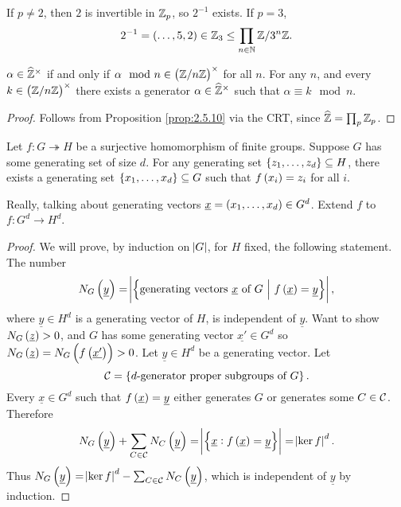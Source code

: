 \pagebreak

\begin{example*}
If $ p \ne 2 $, then $ 2 $ is invertible in $ \mathbb{Z}_p $, so $ 2^{-1} $ exists. If $ p = 3 $,
$$ 2^{-1} = \br{\dots, 5, 2} \in \ZZ_3 \le \prod_{n \in \NN} \ZZ / 3^n\ZZ. $$
\end{example*}

\begin{proposition}
$ \alpha \in \widehat{\mathbb{Z}}^\times $ if and only if $ \alpha \mod n \in \br{\ZZ / n\ZZ}^\times $ for all $ n $. For any $ n $, and every $ k \in \br{\ZZ / n\ZZ}^\times $ there exists a generator $ \alpha \in \widehat{\mathbb{Z}}^\times $ such that $ \alpha \equiv k \mod n $.
\end{proposition}

\begin{proof}
Follows from Proposition \ref{prop:2.5.10} via the CRT, since $ \widehat{\mathbb{Z}} = \prod_p \mathbb{Z}_p $.
\end{proof}

\begin{theorem}
Let $ f : G \twoheadrightarrow H $ be a surjective homomorphism of finite groups. Suppose $ G $ has some generating set of size $ d $. For any generating set $ \cbr{z_1, \dots, z_d} \subseteq H $, there exists a generating set $ \cbr{x_1, \dots, x_d} \subseteq G $ such that $ f\br{x_i} = z_i $ for all $ i $.
\end{theorem}

Really, talking about generating vectors $ \underline{x} = \br{x_1, \dots, x_d} \in G^d $. Extend $ f $ to $ f : G^d \to H^d $.

\begin{proof}
We will prove, by induction on $ \abs{G} $, for $ H $ fixed, the following statement. The number
$$ N_G\br{\underline{y}} = \abs{\cbr{\text{generating vectors} \ \underline{x} \ \text{of} \ G \st f\br{\underline{x}} = \underline{y}}}, $$
where $ \underline{y} \in H^d $ is a generating vector of $ H $, is independent of $ \underline{y} $. Want to show $ N_G\br{\underline{z}} > 0 $, and $ G $ has some generating vector $ \underline{x'} \in G^d $ so $ N_G\br{\underline{z}} = N_G\br{f\br{\underline{x'}}} > 0 $. Let $ \underline{y} \in H^d $ be a generating vector. Let
$$ \CCC = \cbr{\text{$ d $-generator proper subgroups of} \ G}. $$
Every $ \underline{x} \in G^d $ such that $ f\br{\underline{x}} = \underline{y} $ either generates $ G $ or generates some $ C \in \mathcal{C} $. Therefore
$$ N_G\br{\underline{y}} + \sum_{C \in \CCC} N_C\br{\underline{y}} = \abs{\cbr{\underline{x} : f\br{\underline{x}} = \underline{y}}} = \abs{\ker f}^d. $$
Thus $ N_G\br{\underline{y}} = \abs{\ker f}^d - \sum_{C \in \CCC} N_C\br{\underline{y}} $, which is independent of $ \underline{y} $ by induction.
\end{proof}

